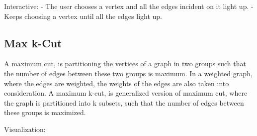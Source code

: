 Interactive: - The user chooses a vertex and all the edges incident on
it light up. - Keeps choosing a vertex until all the edges light up.

\hypertarget{max-k-cut}{%
\subsection{Max k-Cut}\label{max-k-cut}}

A maximum cut, is partitioning the vertices of a graph in two groups such
that the number of edges between these two groups is maximum. In a
weighted graph, where the edges are weighted, the weights of the edges
are also taken into consideration. A maximum k-cut, is generalized
version of maximum cut, where the graph is partitioned into k subsets,
such that the number of edges between these groups is maximized.

Visualization:

